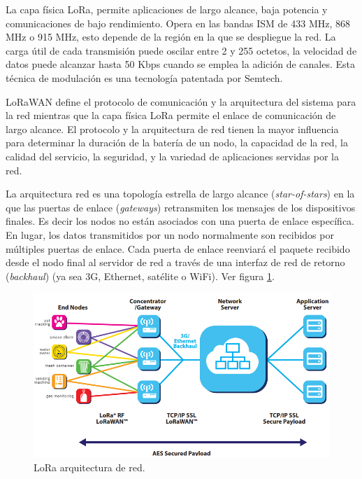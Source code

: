 La capa física LoRa, permite aplicaciones de largo alcance, baja potencia y comunicaciones de bajo rendimiento. Opera en las bandas ISM de 433 MHz, 868 MHz o 915 MHz, esto depende de la región en la que se despliegue la red. La carga útil de cada transmisión puede oscilar entre 2 y 255 octetos, la velocidad de datos puede alcanzar hasta 50 Kbps cuando se emplea la adición de canales. Esta técnica de modulación es una tecnología patentada por Semtech\cite{FEHRI20181096}.


LoRaWAN define el protocolo de comunicación y la arquitectura del sistema para la red mientras que la capa física LoRa permite el enlace de comunicación de largo alcance.
El protocolo y la arquitectura de red tienen la mayor influencia para determinar la duración de la batería de un nodo, la capacidad de la red, la calidad del servicio, la seguridad, y la variedad de aplicaciones servidas por la red. 

La arquitectura red es una topología estrella de largo alcance (\textit{star-of-stars}) en la que las puertas de enlace (\textit{gateways}) retransmiten los mensajes de los dispositivos finales. Es decir los nodos no están asociados con una puerta de enlace específica. En lugar, los datos transmitidos por un nodo normalmente son recibidos por múltiples puertas de enlace. Cada puerta de enlace reenviará el paquete recibido desde el nodo final al servidor de red a través de una interfaz de red de retorno (\textit{backhaul}) (ya sea 3G, Ethernet, satélite o WiFi). Ver figura \ref{fig:Loraarquitecturenetwork}.

\begin{figure}[h]
	\centering
	\includegraphics[scale=.65]{./Figures/Loraarquitecturenetwork.PNG}
	\caption{LoRa arquitectura de red\cite{LoRaAlliance2015}.}
	\label{fig:Loraarquitecturenetwork}
\end{figure}


